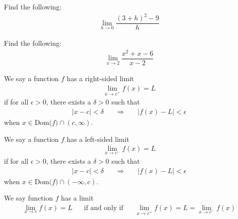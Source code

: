 \begin{exercise} Find the following:
\begin{align*}
    \lim_{h \longrightarrow 0} \dfrac{(3+h)^{2} - 9}{h}
\end{align*}
\end{exercise}

\begin{exercise}
Find the following:
\begin{align*}
    \lim_{x \longrightarrow 2} \dfrac{x^{2}+x-6}{x-2}
\end{align*}
\end{exercise}

\begin{definition}
We say a function $f$ has a right-sided limit
\begin{align*}
    \lim_{x \longrightarrow c^{+}} f(x) = L
\end{align*}
if for all $\epsilon > 0$, there exists a $\delta > 0$ such that
\begin{align*}
    \lvert x - c \rvert < \delta \hspace{20pt} \Longrightarrow \hspace{20pt} \lvert f(x) - L \rvert < \epsilon
\end{align*}
when $x \in \text{Dom($f$)} \cap (c, \infty)$.
\end{definition}

\begin{definition}
We say a function $f$ has a left-sided limit
\begin{align*}
    \lim_{x \longrightarrow c^{-}} f(x) = L
\end{align*}
if for all $\epsilon > 0$, there exists a $\delta > 0$ such that
\begin{align*}
    \lvert x - c \rvert < \delta \hspace{20pt} \Longrightarrow \hspace{20pt} \lvert f(x) - L \rvert < \epsilon
\end{align*}
when $x \in \text{Dom($f$)} \cap (-\infty, c)$.
\end{definition}

\begin{theorem}
We say function $f$ has a limit
\begin{align*}
    \lim_{x \longrightarrow c} f(x) = L \hspace{20pt} \text{if and only if} \hspace{20pt} \lim_{x \longrightarrow c^{+}} f(x) = L = \lim_{x \longrightarrow c^{-}} f(x)
\end{align*}
\end{theorem}


